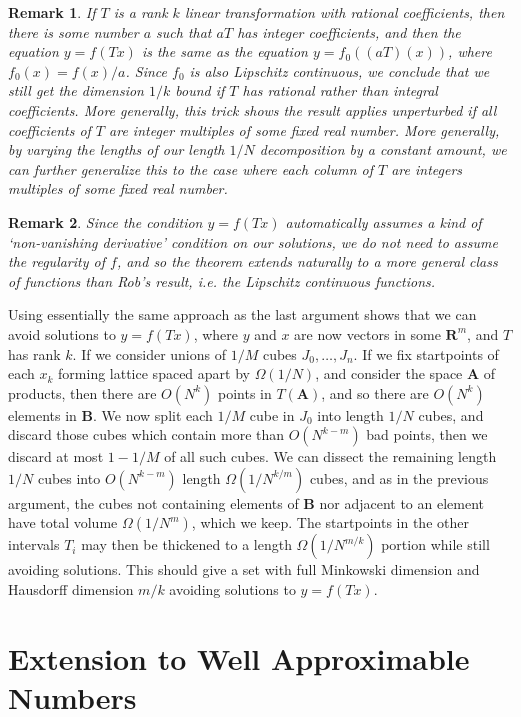 \documentclass{report}
\theoremstyle{plain}
\theoremstyle{plain}
\newtheorem*{remark}{Remark}
\begin{document}
\begin{remark}
    If $T$ is a rank $k$ linear transformation with rational coefficients, then there is some number $a$ such that $aT$ has integer coefficients, and then the equation $y = f(Tx)$ is the same as the equation $y = f_0((aT)(x))$, where $f_0(x) = f(x)/a$. Since $f_0$ is also Lipschitz continuous, we conclude that we still get the dimension $1/k$ bound if $T$ has rational rather than integral coefficients. More generally, this trick shows the result applies unperturbed if all coefficients of $T$ are integer multiples of some fixed real number. More generally, by varying the lengths of our length $1/N$ decomposition by a constant amount, we can further generalize this to the case where each column of $T$ are integers multiples of some fixed real number.
\end{remark}

\begin{remark}
    Since the condition $y = f(Tx)$ automatically assumes a kind of `non-vanishing derivative' condition on our solutions, we do not need to assume the regularity of $f$, and so the theorem extends naturally to a more general class of functions than Rob's result, i.e. the Lipschitz continuous functions.
\end{remark}

Using essentially the same approach as the last argument shows that we can avoid solutions to $y = f(Tx)$, where $y$ and $x$ are now vectors in some $\mathbf{R}^m$, and $T$ has rank $k$. If we consider unions of $1/M$ cubes $J_0, \dots, J_n$. If we fix startpoints of each $x_k$ forming lattice spaced apart by $\Omega(1/N)$, and consider the space $\mathbf{A}$ of products, then there are $O(N^k)$ points in $T(\mathbf{A})$, and so there are $O(N^k)$ elements in $\mathbf{B}$. We now split each $1/M$ cube in $J_0$ into length $1/N$ cubes, and discard those cubes which contain more than $O(N^{k-m})$ bad points, then we discard at most $1 - 1/M$ of all such cubes. We can dissect the remaining length $1/N$ cubes into $O(N^{k-m})$ length $\Omega(1/N^{k/m})$ cubes, and as in the previous argument, the cubes not containing elements of $\mathbf{B}$ nor adjacent to an element have total volume $\Omega(1/N^m)$, which we keep. The startpoints in the other intervals $T_i$ may then be thickened to a length $\Omega(1/N^{m/k})$ portion while still avoiding solutions. This should give a set with full Minkowski dimension and Hausdorff dimension $m/k$ avoiding solutions to $y = f(Tx)$.

\section{Extension to Well Approximable Numbers}
\end{document}
